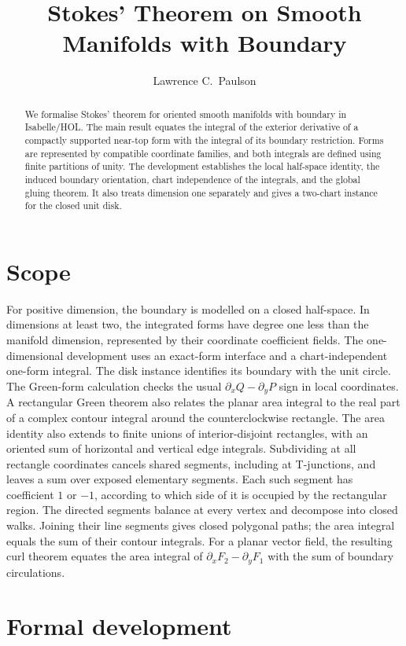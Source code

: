\documentclass[11pt,a4paper]{article}
\begin{document}
\title{Stokes' Theorem on Smooth Manifolds with Boundary}
\author{Lawrence C.\ Paulson}
\maketitle

\begin{abstract}
We formalise Stokes' theorem for oriented smooth manifolds with boundary
in Isabelle/HOL. The main result equates the integral of the exterior
derivative of a compactly supported near-top form with the integral of
its boundary restriction. Forms are represented by compatible
coordinate families, and both integrals are defined using finite
partitions of unity. The development establishes the local half-space
identity, the induced boundary orientation, chart independence of the
integrals, and the global gluing theorem. It also treats dimension one
separately and gives a two-chart instance for the closed unit disk.
\end{abstract}

\section{Scope}

For positive dimension, the boundary is modelled on a closed
half-space. In dimensions at least two, the integrated forms have
degree one less than the manifold dimension, represented by their
coordinate coefficient fields. The one-dimensional development uses
an exact-form interface and a chart-independent one-form integral.
The disk instance identifies its boundary with the unit circle.
The Green-form calculation checks the usual
$\partial_x Q-\partial_y P$ sign in local coordinates.  A rectangular
Green theorem also relates the planar area integral to the real part of a
complex contour integral around the counterclockwise rectangle. The area
identity also extends to finite unions of interior-disjoint rectangles, with
an oriented sum of horizontal and vertical edge integrals. Subdividing at all
rectangle coordinates cancels shared segments, including at T-junctions, and
leaves a sum over exposed elementary segments.
Each such segment has coefficient $1$ or $-1$, according to which side
of it is occupied by the rectangular region.
The directed segments balance at every vertex and decompose into closed
walks. Joining their line segments gives closed polygonal paths; the area
integral equals the sum of their contour integrals.
For a planar vector field, the resulting curl theorem equates the area
integral of $\partial_x F_2-\partial_y F_1$ with the sum of boundary
circulations.

\section{Formal development}


\end{document}
